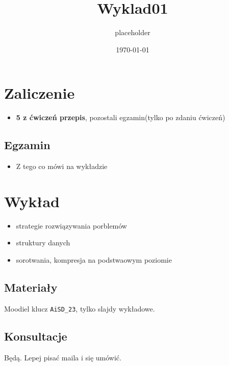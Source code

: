\documentclass[11pt]{article}
\author{placeholder}
\date{\today}
\title{Wyklad01}
\begin{document}
\maketitle
\tableofcontents

\section{Zaliczenie}
\label{sec:orgaf6824b}
\begin{itemize}
\item \textbf{5 z ćwiczeń przepis}, pozostali egzamin(tylko po zdaniu ćwiczeń)
\end{itemize}
\subsection{Egzamin}
\label{sec:orgad29759}
\begin{itemize}
\item Z tego co mówi na wykładzie
\end{itemize}
\section{Wykład}
\label{sec:orgcd5b371}
\begin{itemize}
\item strategie rozwiązywania porblemów
\item struktury danych
\item sorotwania, kompresja na podstwaowym poziomie
\end{itemize}
\subsection{Materiały}
\label{sec:orgaa74839}
Moodiel klucz \texttt{AiSD\_23}, tylko slajdy wykładowe.
\subsection{Konsultacje}
\label{sec:orgff8af6d}
Będą. Lepej pisać maila i się umówić.
\end{document}
